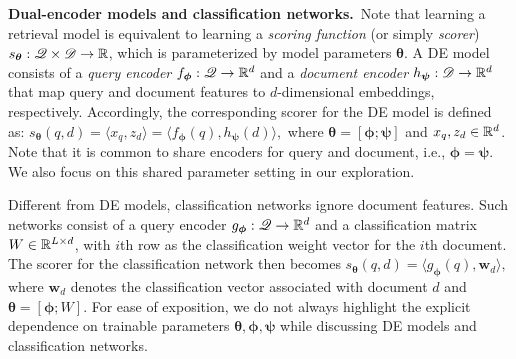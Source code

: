 \documentclass{article}
\begin{document}
\textbf{Dual-encoder models and classification networks.}~Note that learning a retrieval model is equivalent to learning a \textit{scoring function} (or simply \textit{scorer}) $s_{\bm{\theta}}: \mathscr{Q} \times \mathscr{D} \to \mathbb{R}$, which is parameterized by model parameters $\bm{\theta}$. A DE model consists of a \textit{query encoder} $f_{\bm{\phi}}: \mathscr{Q} \to \mathbb{R}^d$ and a \textit{document encoder} $h_{\bm{\psi}}: \mathscr{D} \to \mathbb{R}^d$ that map query and document features to $d$-dimensional embeddings, respectively. Accordingly, the corresponding scorer %
for the DE model is defined as: $s_{\bm{\theta}}(q, d) = \langle x_q, z_d \rangle = \langle f_{\bm{\phi}}(q), h_{\bm{\psi}}(d) \rangle,$
where $\bm{\theta} = [\bm{\phi}; \bm{\psi}]$ and $x_q, z_d \in \mathbb{R}^d$. 
{Note that it is common to share encoders for query and document, i.e., $\bm{\phi} = \bm{\psi}$. We also focus on this shared parameter setting in our exploration.} %

Different from DE models, classification networks ignore document features. Such networks consist of a query encoder $g_{\bm{\phi}}: \mathscr{Q} \to \mathbb{R}^d$ and a classification matrix $W \in \mathbb{R}^{L \times d}$, with $i$th row as the classification weight vector for the $i$th document. %
The scorer for the classification network then becomes $s_{\bm{\theta}}(q,d) = \langle g_{\bm{\phi}}(q), \mathbf{w}_d \rangle,$
where $\mathbf{w}_d $ denotes the classification vector associated with document $d$ and $\bm{\theta} = [\bm{\phi}; W]$. For ease of exposition, we do not always highlight the explicit dependence on trainable parameters $\bm{\theta}, \bm{\phi}, \bm{\psi}$ while discussing DE models and classification networks.
\end{document}
